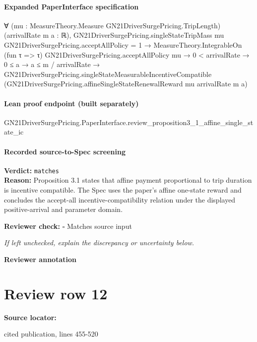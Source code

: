 \documentclass[10pt]{article}
\newcommand{\reviewerbox}{%
  \par\noindent\fbox{\parbox{0.96\linewidth}{\rule{0pt}{0.38in}}}\par
}
\newcommand{\reviewmatch}[1]{%
  \par\noindent\textbf{Reviewer check:} $\square$\; #1\par
  \noindent\emph{If left unchecked, explain the discrepancy or uncertainty below.}\par
}
\begin{document}
\paragraph{Expanded PaperInterface specification}
\begin{ReviewVerbatim}
∀ (mu : MeasureTheory.Measure GN21DriverSurgePricing.TripLength) (arrivalRate m a : ℝ),
  GN21DriverSurgePricing.singleStateTripMass mu GN21DriverSurgePricing.acceptAllPolicy = 1 →
    MeasureTheory.IntegrableOn (fun τ => τ) GN21DriverSurgePricing.acceptAllPolicy mu →
      0 < arrivalRate →
        0 ≤ a →
          a ≤ m / arrivalRate →
            GN21DriverSurgePricing.singleStateMeasurableIncentiveCompatible
              (GN21DriverSurgePricing.affineSingleStateRenewalReward mu arrivalRate m a)
\end{ReviewVerbatim}

\paragraph{Lean proof endpoint (built separately)}\begin{ReviewVerbatim}
GN21DriverSurgePricing.PaperInterface.review_proposition3_1_affine_single_state_ic
\end{ReviewVerbatim}

\paragraph{Recorded source-to-Spec screening}
\textbf{Verdict:} \texttt{matches}
\\
\textbf{Reason:} Proposition 3.1 states that affine payment proportional to trip duration is incentive compatible. The Spec uses the paper's affine one-state reward and concludes the accept-all incentive-compatibility relation under the displayed positive-arrival and parameter domain.
\reviewmatch{Matches source input}
\noindent\textbf{Reviewer annotation}\par
\reviewerbox
\clearpage
\hypertarget{source-claim-cdbb75fcd67baff3}{}
\section*{Review row 12}
\textbf{Source locator:} {\footnotesize\raggedright cited publication, lines 455-\allowbreak{}520\par}
\end{document}
